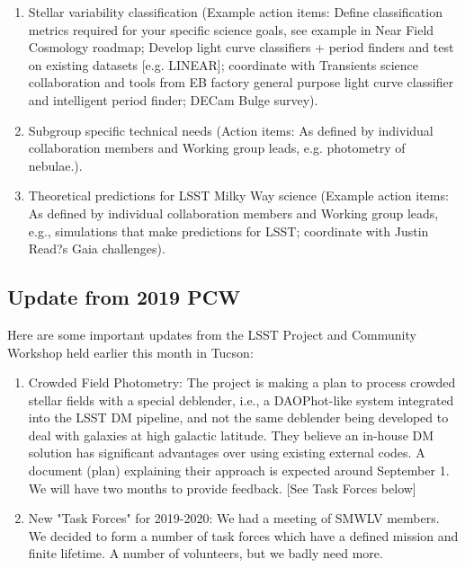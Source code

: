 \begin{enumerate}
\item{Stellar variability classification (Example action items: Define classification metrics required for your specific science goals, see example in Near Field Cosmology roadmap; Develop light curve classifiers + period finders and test on existing datasets [e.g. LINEAR]; coordinate with Transients science collaboration and tools from EB factory general purpose light curve classifier and intelligent period finder; DECam Bulge survey).}

\item{Subgroup specific technical needs (Action items: As defined by individual collaboration members and Working group leads, e.g. photometry of nebulae.).}

\item{Theoretical predictions for LSST Milky Way science (Example action items: As defined by individual collaboration members and Working group leads, e.g., simulations that make predictions for LSST; coordinate with Justin Read?s Gaia challenges).}

\end{enumerate}


\subsection{Update from 2019 PCW}

Here are some important updates from the LSST Project and Community Workshop held earlier this month in Tucson:

\begin{enumerate}

\item{Crowded Field Photometry: The project is making a plan to process crowded stellar fields with a special deblender, i.e., a DAOPhot-like system integrated into the LSST DM pipeline, and not the same deblender being developed to deal with galaxies at high galactic latitude. They believe an in-house DM solution has significant advantages over using existing external codes. A document (plan) explaining their approach is expected around September 1. We will have two months to provide feedback. [See Task Forces below]}

\item{New "Task Forces" for 2019-2020:  We had a meeting of SMWLV members. We decided to form a number of task forces which have a defined mission and finite lifetime.  A number of volunteers, but we badly need more.}

\end{enumerate}


